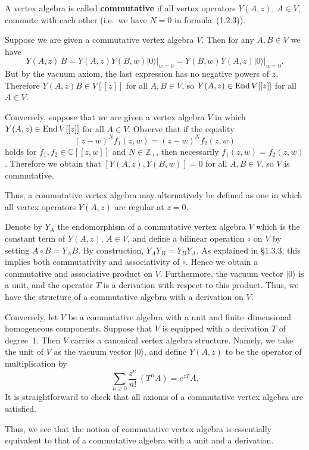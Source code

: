\documentclass[12pt]{article}
\begin{document}
\begin{example}
    A vertex algebra is called \textbf{commutative} if all vertex operators
    $Y(A,z)$, $A \in V$, commute with each other (i.e.\ we have $N=0$ in formula~(1.2.3)).

    Suppose we are given a commutative vertex algebra $V$.
    Then for any $A,B \in V$ we have
    \[
        Y(A,z)\,B = Y(A,z)Y(B,w)\lvert 0 \rangle\big|_{w=0}
        = Y(B,w)Y(A,z)\lvert 0 \rangle\big|_{w=0}.
    \]
    But by the vacuum axiom, the last expression has no negative powers of $z$.
    Therefore $Y(A,z)B \in V[[z]]$ for all $A,B \in V$,
    so $Y(A,z) \in \operatorname{End} V[[z]]$ for all $A \in V$.

    Conversely, suppose that we are given a vertex algebra $V$ in which
    $Y(A,z) \in \operatorname{End} V[[z]]$ for all $A \in V$.
    Observe that if the equality
    \[
        (z-w)^N f_1(z,w) = (z-w)^N f_2(z,w)
    \]
    holds for $f_1,f_2 \in \mathbb{C}[[z,w]]$ and $N \in \mathbb{Z}_+$,
    then necessarily $f_1(z,w) = f_2(z,w)$.
    Therefore we obtain that $[Y(A,z),Y(B,w)] = 0$ for all $A,B \in V$,
    so $V$ is commutative.

    Thus, a commutative vertex algebra may alternatively be defined as one
    in which all vertex operators $Y(A,z)$ are regular at $z=0$.

    \medskip

    Denote by $Y_A$ the endomorphism of a commutative vertex algebra $V$
    which is the constant term of $Y(A,z)$, $A \in V$, and define a bilinear
    operation $\circ$ on $V$ by setting $A \circ B = Y_A B$.
    By construction, $Y_A Y_B = Y_B Y_A$.
    As explained in \S1.3.3, this implies both commutativity and associativity
    of $\circ$.
    Hence we obtain a commutative and associative product on $V$.
    Furthermore, the vacuum vector $\lvert 0 \rangle$ is a unit,
    and the operator $T$ is a derivation with respect to this product.
    Thus, we have the structure of a commutative algebra with a derivation on $V$.

    \medskip

    Conversely, let $V$ be a commutative algebra with a unit and
    finite–dimensional homogeneous components.
    Suppose that $V$ is equipped with a derivation $T$ of degree~1.
    Then $V$ carries a canonical vertex algebra structure.
    Namely, we take the unit of $V$ as the vacuum vector $\lvert 0 \rangle$,
    and define $Y(A,z)$ to be the operator of multiplication by
    \[
        \sum_{n \ge 0} \frac{z^n}{n!}\,(T^n A) = e^{zT}A.
    \]
    It is straightforward to check that all axioms of a commutative vertex algebra
    are satisfied.

    \medskip

    Thus, we see that the notion of commutative vertex algebra is essentially
    equivalent to that of a commutative algebra with a unit and a derivation.
\end{example}
\end{document}
